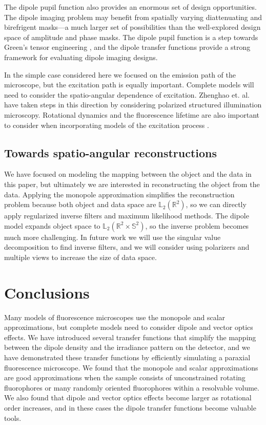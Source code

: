 \documentclass[]{osa-article}
\providecommand{\mbb}[1]{\mathbb{#1}}
\begin{document}
The dipole pupil function also provides an enormous set of design opportunities.
The dipole imaging problem may benefit from spatially varying diattenuating and
birefrigent masks---a much larger set of possibilities than the well-explored
design space of amplitude and phase masks. The dipole pupil function is a step
towards Green's tensor engineering \cite{agrawal2012}, and the dipole transfer
functions provide a strong framework for evaluating dipole imaging designs.

In the simple case considered here we focused on the emission path of the
microscope, but the excitation path is equally important. Complete models will
need to consider the spatio-angular dependence of excitation. Zhenghao et. al.
\cite{zhanghao2017} have taken steps in this direction by considering polarized
structured illumination microscopy. Rotational dynamics and the fluorescence
lifetime are also important to consider when incorporating models of the
excitation process \cite{lew2013, zhang2018, zhang2018-2}.

\subsection{Towards spatio-angular reconstructions}
We have focused on modeling the mapping between the object and the data in this
paper, but ultimately we are interested in reconstructing the object from the
data. Applying the monopole approximation simplifies the reconstruction problem
because both object and data space are $\mbb{L}_2(\mbb{R}^2)$, so we can
directly apply regularized inverse filters and maximum likelihood methods. The
dipole model expands object space to $\mbb{L}_2(\mbb{R}^2\times \mbb{S}^2)$, so
the inverse problem becomes much more challenging. In future work we will use
the singular value decomposition to find inverse filters, and we will consider
using polarizers and multiple views to increase the size of data space. 

\section{Conclusions}
Many models of fluorescence microscopes use the monopole and scalar
approximations, but complete models need to consider dipole and vector optics
effects. We have introduced several transfer functions that simplify the mapping
between the dipole density and the irradiance pattern on the detector, and we
have demonstrated these transfer functions by efficiently simulating a paraxial
fluorescence microscope. We found that the monopole and scalar approximations
are good approximations when the sample consists of unconstrained rotating
fluorophores or many randomly oriented fluorophores within a resolvable volume.
We also found that dipole and vector optics effects become larger as rotational
order increases, and in these cases the dipole transfer functions become
valuable tools.
\end{document}
